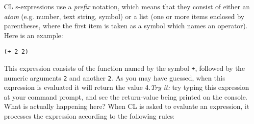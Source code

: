 \documentclass [11pt]{book}
\begin{document}
CL s-expressions use a  \emph{prefix} notation, which means that they consist of either an \emph{atom} (e.g.  number, text string, symbol) or a list (one or more
	  items enclosed by parentheses, where the first item is
	  taken as a symbol which names an operator). Here is an example: 

\begin{verbatim}(+ 2 2)
\end{verbatim}This expression consists of the function named by the symbol \texttt{+}, followed by the numeric arguments \texttt{2} and another \texttt{2}. As you may have guessed, when this expression is evaluated it will return the value 4.\emph{Try it: }try typing this expression at your command prompt, and see
the return-value being printed on the console. What is actually
happening here? When CL is asked to evaluate an expression, it
processes the expression according to the following rules:
\end{document}
